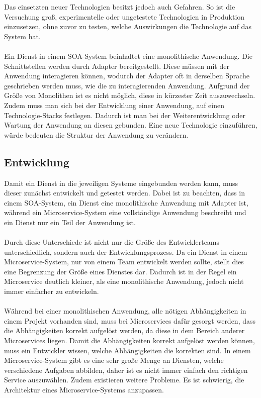 Das einsetzten neuer Technologien besitzt jedoch auch Gefahren. So ist die Versuchung groß, experimentelle oder ungetestete Technologien in Produktion einzusetzen, ohne zuvor zu testen, welche Auswirkungen die Technologie auf das System hat.
\\\\
Ein Dienst in einem SOA-System beinhaltet eine monolithische Anwendung. Die Schnittstellen werden durch Adapter bereitgestellt. Diese müssen mit der Anwendung interagieren können, wodurch der Adapter oft in derselben Sprache geschrieben werden muss, wie die zu interagierenden Anwendung. Aufgrund der Größe von Monolithen ist es nicht möglich, diese in kürzester Zeit auszuwechseln. Zudem muss man sich bei der Entwicklung einer Anwendung, auf einen Technologie-Stacks festlegen. Dadurch ist man bei der Weiterentwicklung oder Wartung der Anwendung an diesen gebunden. Eine neue Technologie einzuführen, würde bedeuten die Struktur der Anwendung zu verändern.

\subsection{Entwicklung}
\label{subsec:Entwicklung}
Damit ein Dienst in die jeweiligen Systeme eingebunden werden kann, muss dieser zunächst entwickelt und getestet werden. Dabei ist zu beachten, dass in einem SOA-System, ein Dienst eine monolithische Anwendung mit Adapter ist, während ein Microservice-System eine vollständige Anwendung beschreibt und ein Dienst nur ein Teil der Anwendung ist.
\\\\
Durch diese Unterschiede ist nicht nur die Größe des Entwicklerteams unterschiedlich, sondern auch der Entwicklungsprozess. Da ein Dienst in einem Microservice-System, nur von einem Team entwickelt werden sollte, stellt dies eine Begrenzung der Größe eines Dienstes dar. Dadurch ist in der Regel ein Microservice deutlich kleiner, als eine monolithische Anwendung, jedoch nicht immer einfacher zu entwickeln.
\\\\
Während bei einer monolithischen Anwendung, alle nötigen Abhängigkeiten in einem Projekt vorhanden sind, muss bei Microservices dafür gesorgt werden, dass die Abhängigkeiten korrekt aufgelöst werden, da diese in dem Bereich anderer Microservices  liegen. Damit die Abhängigkeiten korrekt aufgelöst werden können, muss ein Entwickler wissen, welche Abhängigkeiten die korrekten sind. In einem Microservice-System gibt es eine sehr große Menge an Diensten, welche verschiedene Aufgaben abbilden, daher ist es nicht immer einfach den richtigen Service auszuwählen. Zudem existieren weitere Probleme. Es ist schwierig, die Architektur eines Microservice-Systems anzupassen.

